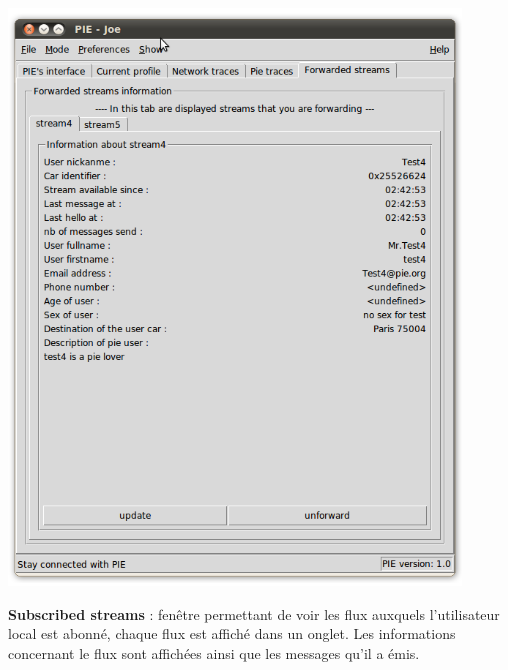 \begin{center}
    \includegraphics[width=0.9\textwidth]{img/forwarded.png}
\end{center}

\textbf{Subscribed streams} : fenêtre permettant de voir les flux auxquels l'utilisateur local est abonné, chaque flux est affiché dans un onglet.
Les informations concernant le flux sont affichées ainsi que les messages qu'il a émis.\\

